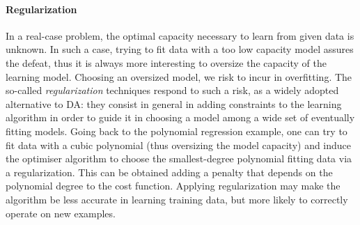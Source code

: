 \begin{figure}
\end{figure}

\paragraph*{Regularization}
In a real-case problem, the optimal capacity necessary to learn from given data is unknown. In such a case, trying to fit data with a too low capacity model assures the defeat, thus it is always more interesting to oversize the capacity of the learning model. Choosing an oversized model, we risk to incur in overfitting. The so-called \emph{regularization} techniques respond to such a risk, as a widely adopted alternative to DA: they consist in general in adding constraints to the learning algorithm in order to guide it in choosing a model among a wide set of eventually fitting models. Going back to the polynomial regression example, one can try to fit data with a cubic polynomial (thus oversizing the model capacity) and induce the optimiser algorithm to choose the smallest-degree polynomial fitting data via a regularization. This can be obtained adding a penalty that depends on the polynomial degree to the cost function. Applying regularization may make the algorithm be less accurate in learning training data, but more likely to correctly operate on new examples.


